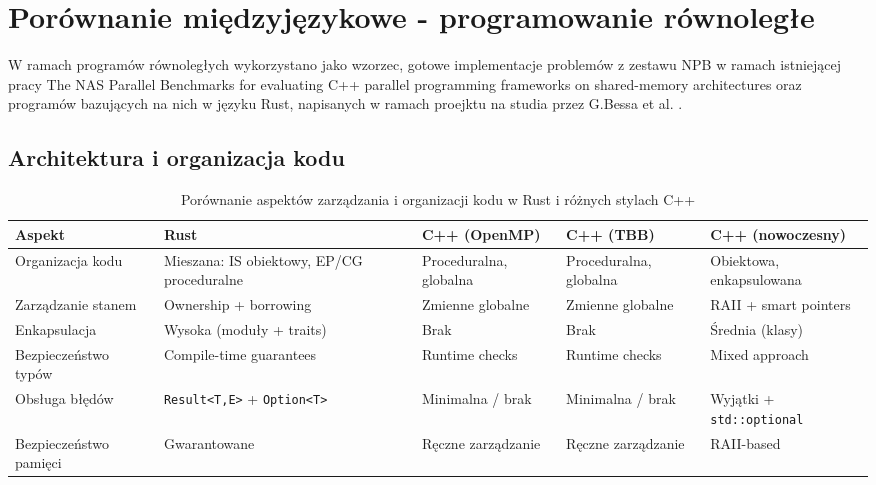 
\chapter{Porównanie międzyjęzykowe - programowanie równoległe}
W ramach programów równoległych wykorzystano jako wzorzec, gotowe implementacje problemów z zestawu NPB w ramach istniejącej pracy The NAS Parallel Benchmarks for evaluating C++ parallel programming frameworks on shared-memory architectures \cite{CPPNPB} oraz programów bazujących na nich w języku Rust, napisanych w ramach proejktu na studia przez G.Bessa et al. \cite{NPBRust}.






\section{Architektura i organizacja kodu}
\begin{table}[H]
    \centering
    \caption{Porównanie aspektów zarządzania i organizacji kodu w Rust i różnych stylach C++}
    \begin{tabularx}{\textwidth}{lXXXX}
    \toprule
    \textbf{Aspekt} &
    \textbf{Rust} &
    \textbf{C++ (OpenMP)} &
    \textbf{C++ (TBB)} &
    \textbf{C++ (nowoczesny)} \\
    \midrule
    Organizacja kodu &
    Mieszana: IS obiektowy, EP/CG proceduralne &
    Proceduralna, globalna &
    Proceduralna, globalna &
    Obiektowa, enkapsulowana \\
    \hline
    Zarządzanie stanem &
    Ownership + borrowing &
    Zmienne globalne &
    Zmienne globalne &
    RAII + smart pointers \\
    \hline
    Enkapsulacja &
    Wysoka (moduły + traits) &
    Brak &
    Brak &
    Średnia (klasy) \\
    \hline
    Bezpieczeństwo typów &
    Compile-time guarantees &
    Runtime checks &
    Runtime checks &
    Mixed approach \\
    \hline
    Obsługa błędów &
    \texttt{Result<T,E>} + \texttt{Option<T>} &
    Minimalna / brak &
    Minimalna / brak &
    Wyjątki + \texttt{std::optional} \\
    \hline
    Bezpieczeństwo pamięci &
    Gwarantowane &
    Ręczne zarządzanie &
    Ręczne zarządzanie &
    RAII-based \\
    \bottomrule
    \end{tabularx}
\end{table}

